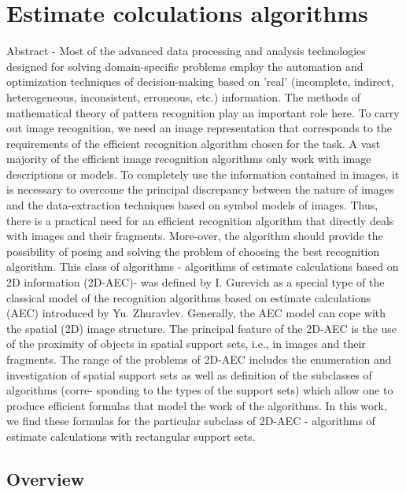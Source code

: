 \section{Estimate colculations algorithms}
Abstract - Most of the advanced data processing and analysis technologies 
designed for solving domain-specific problems employ the automation and 
optimization techniques of decision-making based on 'real' (incomplete, 
indirect, heterogeneous, inconsistent, erroneous, etc.) information. 
The methods of mathematical theory of pattern recognition play an important role here. 
To carry out image recognition, we need an image representation that 
corresponds to the requirements of the efficient recognition algorithm chosen 
for the task. A vast majority of the efficient image recognition algorithms 
only work with image descriptions or models. To completely use the information 
contained in images, it is necessary to overcome the principal discrepancy between 
the nature of images and the data-extraction techniques based on symbol models of 
images. Thus, there is a practical need for an efficient recognition algorithm that 
directly deals with images and their fragments. More-over, the algorithm should 
provide the possibility of posing and solving the problem of choosing the best
recognition algorithm. This class of algorithms - algorithms of estimate calculations 
based on 2D information (2D-AEC)- was defined by I. Gurevich as a special type of 
the classical model of the recognition algorithms based on estimate calculations 
(AEC) introduced by Yu. Zhuravlev. Generally, the AEC model can cope with the spatial 
(2D) image structure. The principal feature of the 2D-AEC is the use of the proximity 
of objects in spatial support sets, i.e., in images and their fragments. The range 
of the problems of 2D-AEC includes the enumeration and investigation of spatial 
support sets as well as definition of the subclasses of algorithms (corre- sponding 
to the types of the support sets) which allow one to produce efficient formulas that 
model the work of the algorithms. In this work, we find these formulas for the particular 
subclass of 2D-AEC - algorithms of estimate calculations with rectangular support sets.
\subsection{Overview}


